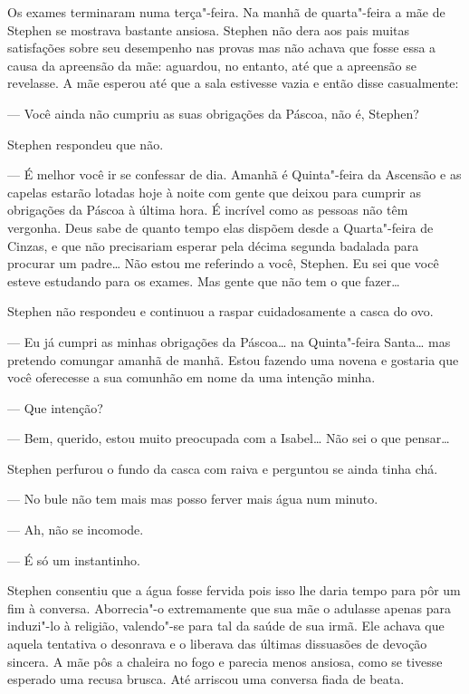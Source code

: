 Os exames terminaram numa terça"-feira.  Na manhã de quarta"-feira a mãe de
Stephen se mostrava bastante ansiosa.  Stephen não dera aos pais muitas
satisfações sobre seu desempenho nas provas mas não achava que fosse essa a
causa da apreensão da mãe: aguardou, no entanto, até que a apreensão se
revelasse.  A mãe esperou até que a sala estivesse vazia e então disse
casualmente:

--- Você ainda não cumpriu as suas obrigações da Páscoa, não é, Stephen?

Stephen respondeu que não.

--- É melhor você ir se confessar de dia.  Amanhã é Quinta"-feira da Ascensão e
as capelas estarão lotadas hoje à noite com gente que deixou para cumprir as
obrigações da Páscoa à última hora.  É incrível como as pessoas não têm
vergonha.  Deus sabe de quanto tempo elas dispõem desde a Quarta"-feira de
Cinzas, e que não precisariam esperar pela décima segunda badalada para
procurar um padre\ldots{}  Não estou me referindo a você, Stephen.  Eu sei que você
esteve estudando para os exames.  Mas gente que não tem o que fazer\ldots{}

Stephen não respondeu e continuou a raspar cuidadosamente a casca do ovo.

--- Eu já cumpri as minhas obrigações da Páscoa\ldots{} na Quinta"-feira Santa\ldots{} mas
pretendo comungar amanhã de manhã.  Estou fazendo uma novena e gostaria que
você oferecesse a sua comunhão em nome da uma intenção minha.

--- Que intenção?

--- Bem, querido, estou muito preocupada com a Isabel\ldots{}  Não sei o que
pensar\ldots{}

Stephen perfurou o fundo da casca \label{com"-raiva} com raiva e perguntou se ainda tinha chá.

--- No bule não tem mais mas posso ferver mais água num minuto.

--- Ah, não se incomode.

--- É só um instantinho.

Stephen consentiu que a água fosse fervida pois isso lhe daria tempo para pôr
um fim à conversa.  Aborrecia"-o extremamente que sua mãe o adulasse apenas para
induzi"-lo à religião, valendo"-se para tal da saúde de sua irmã.  Ele achava que
aquela tentativa o desonrava e o liberava das últimas dissuasões de devoção
sincera.  A mãe pôs a chaleira no fogo e parecia menos ansiosa, como se tivesse
esperado uma recusa brusca.  Até arriscou uma conversa fiada de beata.

